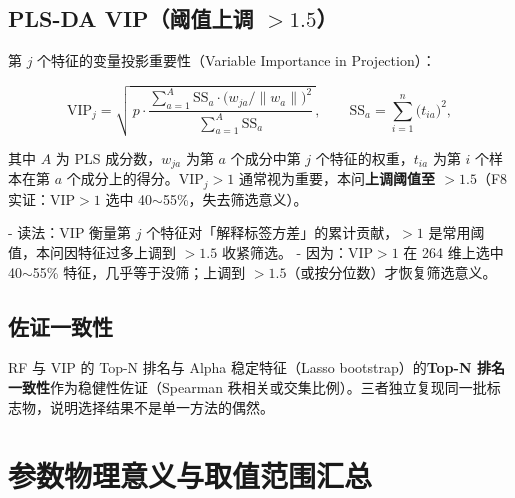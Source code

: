 \documentclass{internal-report}
\begin{document}
\subsection{PLS-DA VIP（阈值上调 $>1.5$）}
\label{sec:vip}

第 $j$ 个特征的变量投影重要性（Variable Importance in Projection）：

\begin{equation}
  \mathrm{VIP}_j = \sqrt{\,p\cdot\frac{\sum_{a=1}^{A}\mathrm{SS}_a\cdot\big(w_{ja}/\lVert w_a\rVert\big)^2}{\sum_{a=1}^{A}\mathrm{SS}_a}\,},
  \qquad
  \mathrm{SS}_a = \sum_{i=1}^{n}\big(t_{ia}\big)^2,
  \label{eq:vip}
\end{equation}

其中 $A$ 为 PLS 成分数，$w_{ja}$ 为第 $a$ 个成分中第 $j$ 个特征的权重，$t_{ia}$ 为第 $i$ 个样本在第 $a$ 个成分上的得分。$\mathrm{VIP}_j>1$ 通常视为重要，本问\textbf{上调阈值至 $>1.5$}（F8 实证：VIP$>1$ 选中 40$\sim$55\%，失去筛选意义）。

- 读法：VIP 衡量第 $j$ 个特征对「解释标签方差」的累计贡献，$>1$ 是常用阈值，本问因特征过多上调到 $>1.5$ 收紧筛选。
- 因为：VIP$>1$ 在 264 维上选中 40$\sim$55\% 特征，几乎等于没筛；上调到 $>1.5$（或按分位数）才恢复筛选意义。

\subsection{佐证一致性}
\label{sec:consistency}

RF 与 VIP 的 Top-N 排名与 Alpha 稳定特征（Lasso bootstrap）的\textbf{Top-N 排名一致性}作为稳健性佐证（Spearman 秩相关或交集比例）。三者独立复现同一批标志物，说明选择结果不是单一方法的偶然。

\section{参数物理意义与取值范围汇总}
\end{document}

